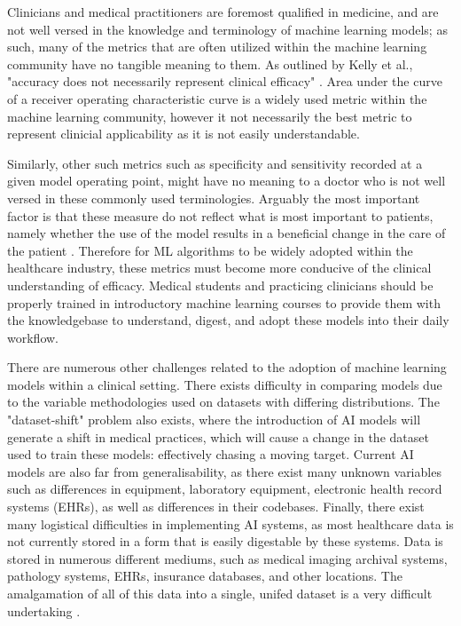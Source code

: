 \documentclass[a4paper]{article}
\begin{document}
Clinicians and medical practitioners are foremost qualified in medicine, and are not well versed in the knowledge and terminology of machine learning models; as such, many of the metrics that are often utilized within the machine learning community have no tangible meaning to them. As outlined by Kelly et al., "accuracy does not necessarily represent clinical efficacy" \cite{Kelly_2019}. Area under the curve of a receiver operating characteristic curve is a widely used metric within the machine learning community, however it not necessarily the best metric to represent clinicial applicability as it is not easily understandable. 

Similarly, other such metrics such as specificity and sensitivity recorded at a given model operating point, might have no meaning to a doctor who is not well versed in these commonly used terminologies. Arguably the most important factor is that these measure do not reflect what is most important to patients, namely whether the use of the model results in a beneficial change in the care of the patient \cite{Kelly_2019}. Therefore for ML algorithms to be widely adopted within the healthcare industry, these metrics must become more conducive of the clinical understanding of efficacy. Medical students and practicing clinicians should be properly trained in introductory machine learning courses to provide them with the knowledgebase to understand, digest, and adopt these models into their daily workflow.

There are numerous other challenges related to the adoption of machine learning models within a clinical setting. There exists difficulty in comparing models due to the variable methodologies used on datasets with differing distributions. The "dataset-shift" problem also exists, where the introduction of AI models will generate a shift in medical practices, which will cause a change in the dataset used to train these models: effectively chasing a moving target. Current AI models are also far from generalisability, as there exist many unknown variables such as differences in equipment, laboratory equipment, electronic health record systems (EHRs), as well as differences in their codebases. Finally, there exist many logistical difficulties in implementing AI systems, as most healthcare data is not currently stored in a form that is easily digestable by these systems. Data is stored in numerous different mediums, such as medical imaging archival systems, pathology systems, EHRs, insurance databases, and other locations. The amalgamation of all of this data into a single, unifed dataset is a very difficult undertaking \cite{Kelly_2019}. 
\end{document}
